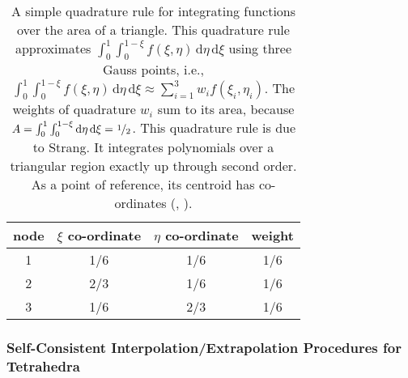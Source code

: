 \begin{table}
    \begin{center}
    \begin{tabular}{|c|ccc|}
        \hline
        node & $\xi$ co-ordinate & $\eta$ co-ordinate  & weight \\ \hline        
        1 & 1/6 & 1/6 & 1/6 \\ 
        2 & 2/3 & 1/6 & 1/6 \\ 
        3 & 1/6 & 2/3 & 1/6 \\ 
        \hline
    \end{tabular}
    \end{center}
    \caption{A simple quadrature rule for integrating functions over the area of a triangle.  This quadrature rule approximates $\int_0^1 \int_0^{1-\xi} f(\xi , \eta) \, \mathrm{d} \eta \, \mathrm{d} \xi$  using three Gauss points, i.e., $\int_0^1 \int_0^{1-\xi} f(\xi , \eta) \, \mathrm{d} \eta \, \mathrm{d} \xi \approx \sum_{i=1}^3 w_i f(\xi_i , \eta_i )$.  The weights of quadrature $w_i$ sum to its area, because $A = \int_0^1 \int_0^{1-\xi} \mathrm{d}\eta \, \mathrm{d} \xi = \textfrac{1}{2}$.  This quadrature rule is due to Strang.  It integrates polynomials over a triangular region exactly up through second order. As a point of reference, its centroid has co-ordinates (, ).}
    \label{tab:3nodeTriangle}
\end{table}
    
\subsubsection{Self-Consistent Interpolation\slash Extrapolation Procedures for Tetrahedra}
    
